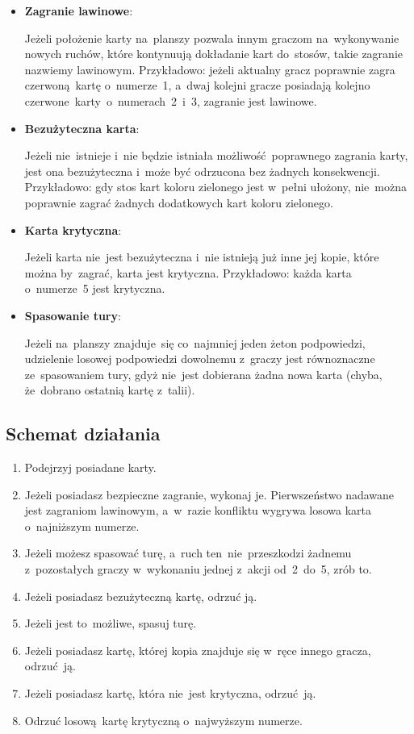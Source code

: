 \documentclass[declaration,shortabstract,inz]{iithesis}
\begin{document}
\begin{itemize}
	\item \textbf{Zagranie lawinowe}:
	
	Jeżeli położenie karty na~planszy pozwala innym graczom na~wykonywanie nowych ruchów, które kontynuują dokładanie kart do~stosów, takie zagranie nazwiemy lawinowym. Przykładowo: jeżeli aktualny gracz poprawnie zagra czerwoną kartę o~numerze~1, a~dwaj kolejni gracze posiadają kolejno czerwone~karty o~numerach~2~i~3, zagranie jest lawinowe.
	
	\item \textbf{Bezużyteczna karta}:
	
	Jeżeli nie~istnieje i~nie będzie istniała możliwość poprawnego zagrania karty, jest ona bezużyteczna i~może być odrzucona bez żadnych konsekwencji. Przykładowo: gdy stos kart koloru zielonego jest w~pełni ułożony, nie~można poprawnie zagrać żadnych dodatkowych kart koloru zielonego.
	
	\item \textbf{Karta krytyczna}:
	
	Jeżeli karta nie~jest bezużyteczna i~nie istnieją już inne jej kopie, które można by~zagrać, karta jest krytyczna. Przykładowo: każda karta o~numerze~5 jest krytyczna.
	
	\item \textbf{Spasowanie tury}:
	
	Jeżeli na~planszy znajduje~się co~najmniej jeden żeton podpowiedzi, udzielenie losowej podpowiedzi dowolnemu z~graczy jest równoznaczne ze~spasowaniem tury, gdyż nie~jest dobierana żadna nowa karta (chyba, że~dobrano ostatnią kartę z~talii).
\end{itemize}

\subsection*{Schemat działania}

\begin{enumerate}
	\item Podejrzyj posiadane karty.
	\item Jeżeli posiadasz bezpieczne zagranie, wykonaj je. Pierwszeństwo nadawane jest zagraniom lawinowym, a~w~razie konfliktu wygrywa losowa karta o~najniższym numerze.
	\item Jeżeli możesz spasować turę, a~ruch ten~nie~przeszkodzi żadnemu z~pozostałych graczy w~wykonaniu jednej z~akcji od~2~do~5, zrób to.
	\item Jeżeli posiadasz bezużyteczną kartę, odrzuć ją.
	\item Jeżeli jest to~możliwe, spasuj turę.
	\item Jeżeli posiadasz kartę, której kopia znajduje się w~ręce innego gracza, odrzuć ją.
	\item Jeżeli posiadasz kartę, która nie~jest krytyczna, odrzuć ją.
	\item Odrzuć losową kartę krytyczną o~najwyższym numerze.
\end{enumerate}
\end{document}
